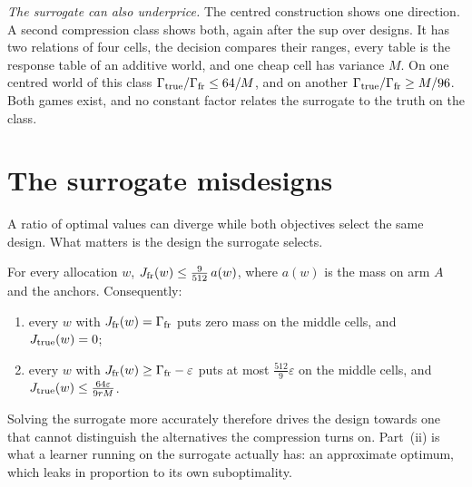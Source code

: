 \emph{The surrogate can also underprice.} The centred construction shows one direction. A second
compression class shows both, again after the sup over designs. It has two relations of four
cells, the decision compares their ranges, every table is the response table of an additive
world, and one cheap cell has variance $M$. On one centred world of this class
$\Gamma_{\rm true}/\Gamma_{\rm fr}\le64/M$, and on another $\Gamma_{\rm true}/\Gamma_{\rm fr}\ge M/96$.
Both games exist, and no constant factor relates the surrogate to the truth on the class.


\section{The surrogate misdesigns}
\label{sec:starve}

A ratio of optimal values can diverge while both objectives select the same design. What
matters is the design the surrogate selects.

\begin{theorem}[Starvation]
\label{thm:starve}
For every allocation $w$, $J_{\rm fr}(w)\le\frac{9}{512}\,a(w)$, where $a(w)$ is the mass on
arm $A$ and the anchors. Consequently:
\begin{enumerate}
\item[(i)] every $w$ with $J_{\rm fr}(w)=\Gamma_{\rm fr}$ puts zero mass on the middle cells,
and $J_{\rm true}(w)=0$;
\item[(ii)] every $w$ with $J_{\rm fr}(w)\ge\Gamma_{\rm fr}-\varepsilon$ puts at most
$\frac{512}{9}\varepsilon$ on the middle cells, and $J_{\rm true}(w)\le\frac{64\varepsilon}{9rM}$.
\end{enumerate}
\end{theorem}


Solving the surrogate more accurately therefore drives the design towards one that cannot
distinguish the alternatives the compression turns on. Part~(ii) is what a learner running on
the surrogate actually has: an approximate optimum, which leaks in proportion to its own
suboptimality.

